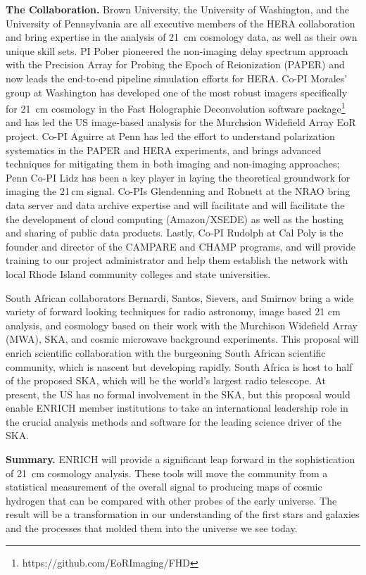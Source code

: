 \documentclass[preprint,11pt]{aastex}
\begin{document}
\vspace{8pt}
\textbf{The Collaboration.} Brown University, the University of Washington, and the University of Pennsylvania are all executive members of the HERA collaboration and bring expertise in the analysis of 21\, cm cosmology data, as well as their own unique skill sets.  PI Pober pioneered the non-imaging delay spectrum approach with the Precision Array for Probing the Epoch of Reionization (PAPER) and now leads the end-to-end pipeline simulation efforts for HERA.  Co-PI Morales' group at Washington has developed one of the most robust imagers specifically for 21\, cm cosmology in the Fast Holographic Deconvolution software package\footnote{https://github.com/EoRImaging/FHD} and has led the US image-based analysis for the Murchsion Widefield Array EoR project.  Co-PI Aguirre at Penn has led the effort to understand polarization systematics in the PAPER and HERA experiments, and brings advanced techniques for mitigating them in both imaging and non-imaging approaches; Penn Co-PI Lidz has been a key player in laying the theoretical groundwork for imaging the 21\,cm signal.  Co-PIs Glendenning and Robnett at the NRAO bring data server and data archive expertise and will facilitate and will facilitate the the development of cloud computing (Amazon/XSEDE) as well as the hosting and sharing of public data products.  Lastly, Co-PI Rudolph at Cal Poly is the founder and director of the CAMPARE and CHAMP programs, and will provide training to our project administrator and help them establish the network with local Rhode Island community colleges and state universities.

South African collaborators Bernardi, Santos, Sievers, and Smirnov bring a wide variety of forward looking techniques for radio astronomy, image based 21 cm analysis, and cosmology based on their work with the Murchison Widefield Array (MWA), SKA, and cosmic microwave background experiments.  This proposal will enrich scientific collaboration with the burgeoning South African scientific community, which is nascent but developing rapidly.  South Africa is host to half of the proposed SKA, which will be the world’s largest radio telescope. At present, the US has no formal involvement in the SKA, but this proposal would enable ENRICH member institutions to take an international leadership role in the crucial analysis methods and software for the leading science driver of the SKA.

\vspace{8pt}
\textbf{Summary.} ENRICH will provide a significant leap forward in the sophistication of 21\, cm cosmology analysis.  These tools will move the community from a statistical measurement of the overall signal to producing maps of cosmic hydrogen that can be compared with other probes of the early universe.  The result will be a transformation in our understanding of the first stars and galaxies and the processes that molded them into the universe we see today.
\end{document}
